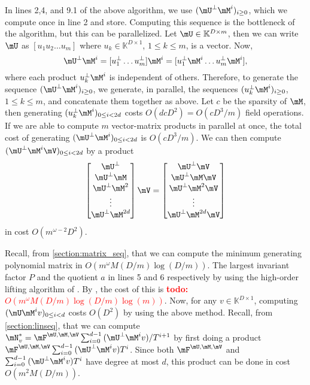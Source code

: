 \documentclass[12pt]{article}
\newcommand{\todo}[1]{\textcolor{red}{{\bf todo:} #1}}
\begin{document}
In lines 2,4, and 9.1 of the above algorithm, we use $(\mU^{\perp}\mM^i)_{i\ge 0}$, which we compute once
in line 2 and store. Computing this sequence is the bottleneck of the algorithm, but this can be
parallelized. Let $\mU \in \mathbb{K}^{D \times m}$, then we can write $\mU$ as $[u_1 u_2 \dots u_m]$ where
$u_k \in \mathbb{K}^{D \times 1}$, $1 \le k \le m$, is a vector. Now,
$$ \mU^{\perp} \mM^i = [u_1^{\perp} \dots u_m^{\perp}] \mM^i = [u_1^{\perp} \mM^i \dots u_m^{\perp} \mM^i],$$
where each product $u_k^{\perp} \mM^i$ is independent of others. Therefore, to generate the
sequence $(\mU^{\perp}\mM^i)_{i\ge0}$, we generate, in parallel, 
the sequences $(u_k^{\perp} \mM^i)_{i\ge0}$, $1 \le k \le m$, and concatenate them together as above.
Let $c$ be the sparsity of $\mM$, then generating $(u_k^{\perp} \mM^i)_{0 \le i < 2d}$ costs 
$O(d cD^2) = O(cD^3/m )$ field operations. If we are able to compute $m$ 
vector-matrix products in parallel at once, the total cost of generating $(\mU^{\perp}\mM^i)_{0 \le i < 2d}$
is $O(cD^3/m)$. We can then compute $(\mU^{\perp}\mM^i\mV)_{0 \le i < 2d}$ by a product
$$
\begin{bmatrix}
\mU^{\perp}\\
\mU^{\perp} \mM\\
\mU^{\perp} \mM^2\\
\vdots\\
\mU^{\perp} \mM^{2d}\\
\end{bmatrix} \mV
= 
\begin{bmatrix}
\mU^{\perp} \mV\\
\mU^{\perp} \mM \mV\\
\mU^{\perp} \mM^2 \mV\\
\vdots \\
\mU^{\perp} \mM^{2d} \mV\\
\end{bmatrix}
$$
in cost $O(m^{\omega-2}D^2)$.

Recall, from \cref{section:matrix_seq}, that we can compute
the minimum generating polynomial matrix in $O(m^{\omega} M(D/m) \log(D/m))$.
The largest invariant factor $P$ and the quotient $a$ in lines 5 and 6 respectively by using the high-order
lifting algorithm of \cite[Algorithm~5]{Stor03}. 
By \cite[Corollary~16]{Stor03}, the cost of this is 
\todo{$O(m^{\omega} M(D/m) \log(D/m) \log(m))$}.
Now, for any $v\in\mathbb{K}^{D \times 1}$, computing $(\mU \mM^i v)_{0\le i < d}$ costs
$O(D^2)$ by using the above method.
Recall, from \cref{section:linseq}, that
we can compute $\mN_v^* = \mF^{\mU,\mM,\mV}\sum_{i=0}^{d-1} {(\mU^{\perp}\mM^iv)}/{T^{i+1}}$ by first
doing a product $\mF^{\mU,\mM,\mV}\sum_{i=0}^{d-1} {(\mU^{\perp}\mM^iv)}T^i$.
Since both $\mF^{\mU,\mM,\mV}$ and $\sum_{i=0}^{d-1} {(\mU^{\perp}\mM^iv)}T^i$
have degree at most $d$, this product can be done in cost $O(m^2M(D/m))$.
\end{document}
